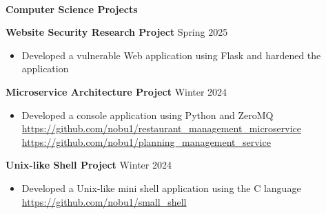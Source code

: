 \begin{flushleft}
    \hrulefill \\
    \begin{large}
        \begin{center}\textbf{Computer Science Projects} \end{center}
    \end{large} 
\end{flushleft}
\textbf{Website Security Research Project} \hfill Spring 2025
\begin{itemize}
    \item Developed a vulnerable Web application using Flask and hardened the application
\end{itemize}
\textbf{Microservice Architecture Project} \hfill Winter 2024
\begin{itemize}
    \item Developed a console application using Python and ZeroMQ \\
	\url{https://github.com/nobu1/restaurant_management_microservice} \\
	\url{https://github.com/nobu1/planning_management_service}
\end{itemize}
\textbf{Unix-like Shell Project} \hfill Winter 2024
\begin{itemize}
    \item Developed a Unix-like mini shell application using the C language \\
	\url{https://github.com/nobu1/small_shell}
\end{itemize}